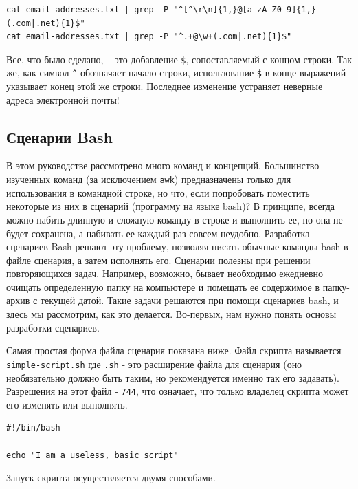 \documentclass[12pt]{article}
\begin{document}
\begin{verbatim}
cat email-addresses.txt | grep -P "^[^\r\n]{1,}@[a-zA-Z0-9]{1,}(.com|.net){1}$"
cat email-addresses.txt | grep -P "^.+@\w+(.com|.net){1}$"
\end{verbatim}

Все, что было сделано, -- это добавление \texttt{\$}, сопоставляемый с
концом строки. Так же, как символ \texttt{\^{}} обозначает начало
строки, использование \texttt{\$} в конце выражений указывает конец этой
же строки. Последнее изменение устраняет неверные адреса электронной
почты!

\hypertarget{Bash-Scripting}{%
\subsection{\texorpdfstring{\protect\hyperlink{Bash-Scripting}{}Сценарии
Bash}{Сценарии Bash}}\label{Bash-Scripting}}

В этом руководстве рассмотрено много команд и концепций. Большинство
изученных команд (за исключением \texttt{awk}) предназначены только для
использования в командной строке, но что, если попробовать поместить
некоторые из них в сценарий (программу на языке bash)? В принципе,
всегда можно набить длинную и сложную команду в строке и выполнить ее,
но она не будет сохранена, а набивать ее каждый раз совсем неудобно.
Разработка сценариев Bash решают эту проблему, позволяя писать обычные
команды bash в файле сценария, а затем исполнять его. Сценарии полезны
при решении повторяющихся задач. Например, возможно, бывает необходимо
ежедневно очищать определенную папку на компьютере и помещать ее
содержимое в папку-архив с текущей датой. Такие задачи решаются при
помощи сценариев bash, и здесь мы рассмотрим, как это делается.
Во-первых, нам нужно понять основы разработки сценариев.

Самая простая форма файла сценария показана ниже. Файл скрипта
называется \texttt{simple-script.sh} где \texttt{.sh} - это расширение
файла для сценария (оно необязательно должно быть таким, но
рекомендуется именно так его задавать). Разрешения на этот файл -
\texttt{744}, что означает, что только владелец скрипта может его
изменять или выполнять.

\begin{verbatim}
#!/bin/bash

echo "I am a useless, basic script"
\end{verbatim}

Запуск скрипта осуществляется двумя способами.
\end{document}
